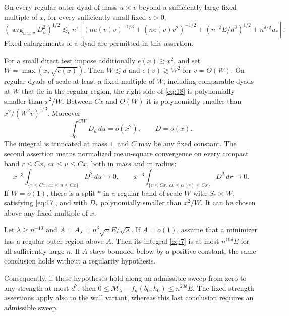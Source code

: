 \begin{proposition}\label{comp:direct-moments}
On every regular outer dyad of mass $u\asymp v$ beyond a sufficiently
large fixed multiple of $x$, for every sufficiently small fixed
$\epsilon>0$,
\begin{equation}
 \left(\operatorname{avg}_{u\asymp v}D_u^2\right)^{1/2}
 \lesssim_\epsilon n^\epsilon\left[
 (ne(v)v)^{-1/3}+(ne(v)v^2)^{-1/2}
 +(n^{-\delta}E/d^3)^{1/2}+n^{\delta/2}u_*\right].
 \tag{18}\label{eq:18}
\end{equation}
Fixed enlargements of a dyad are permitted in this assertion.

For a small direct test impose additionally $e(x)\gtrsim x^2$, and set
$W=\max(x,\sqrt{e(x)})$.  Then $W\lesssim d$ and
$e(v)\gtrsim W^2$ for $v=O(W)$.  On regular dyads of scale at least
a fixed multiple of $W$, including comparable dyads at $W$ that lie in
the regular region, the right side of \eqref{eq:18} is polynomially
smaller than $x^2/W$.  Between $Cx$ and $O(W)$ it is polynomially
smaller than $x^2/(W^2v)^{1/3}$.  Moreover
\begin{equation}
 \int_0^{CW}D_u\,du=o(x^2),\qquad D=o(x).
 \tag{19}\label{eq:19}
\end{equation}
The integral is truncated at mass $1$, and $C$ may be any fixed
constant.  The second assertion means normalized mean-square
convergence on every compact band
$r\le Cx$, $cx\le u\le Cx$, both in mass and in radius:
\[
 x^{-3}\int_{\{r\le Cx,\,cx\le u\le Cx\}}D^2\,du\longrightarrow0,
 \qquad
 x^{-3}\int_{\{r\le Cx,\,cx\le\alpha(r)\le Cx\}}D^2\,dr
 \longrightarrow0.
\]
If $W=o(1)$, there is a split $*$ in a regular band of scale $W$ with
$S_*\asymp W$, satisfying \eqref{eq:17}, and with $D_*$ polynomially
smaller than $x^2/W$.  It can be chosen above any fixed multiple of $x$.
\end{proposition}

\begin{proposition}\label{comp:conditional-error}
Let $\lambda\ge n^{-10}$ and
$A=A_\lambda=n^\delta\sqrt n E/\sqrt\lambda$.  If $A=o(1)$,
assume that a minimizer has a regular outer region above $A$.
Then its integral \eqref{eq:7} is at most $n^{10\delta}E$ for all
sufficiently large $n$.  If $A$ stays bounded below by a positive
constant, the same conclusion holds without a regularity hypothesis.

Consequently, if these hypotheses hold along an admissible sweep from
zero to any strength at most $d^2$, then
$0\le\mathcal M_\lambda-f_n(b_0,h_0)\le n^{20\delta}E$.
The fixed-strength assertions apply also to the wall variant, whereas
this last conclusion requires an admissible sweep.
\end{proposition}

